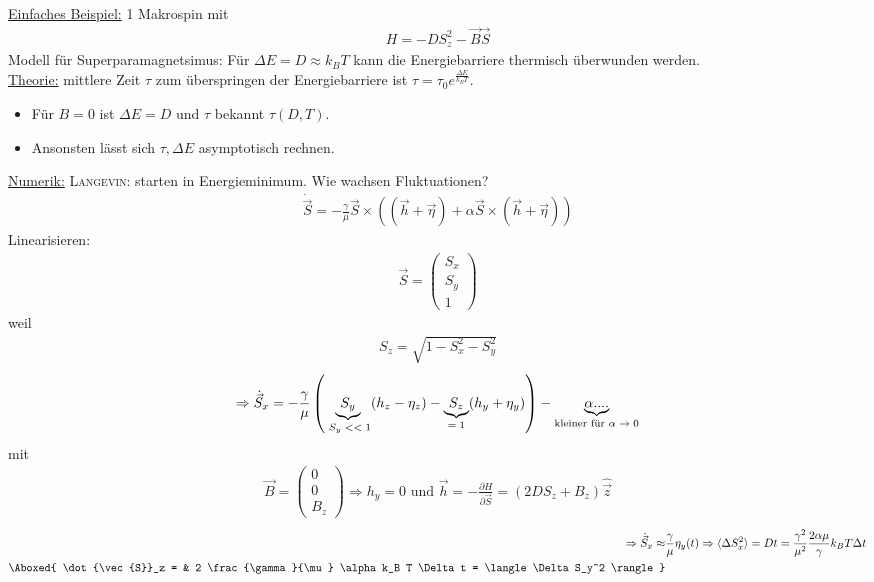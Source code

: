 \documentclass[12pt]{article}
\begin{document}
   \underline{Einfaches Beispiel:} 1 Makrospin mit 
   \begin{align*}
   H = -D S_z^2 - \vec{B} \vec{S}
   \end{align*}
   Modell für Superparamagnetsimus: Für $\Delta E = D \approx k_B T$ kann die Energiebarriere thermisch überwunden werden. \\
   \underline{Theorie:} mittlere Zeit $\tau$ zum überspringen der Energiebarriere ist $\tau = \tau_0 e^\frac{\Delta E}{k_B T}$. \begin{itemize}
   \item Für $B=0$ ist $\Delta E = D$ und $\tau $ bekannt $\tau (D, T)$. 
    \item Ansonsten lässt sich $\tau, \Delta E$ asymptotisch rechnen.
    \end{itemize}
    \underline{Numerik:} \textsc{Langevin:} starten in Energieminimum. Wie wachsen Fluktuationen?
    \begin{align}
    \dot{\vec{S}} = - \frac{\gamma}{\mu} \vec{S} \times \left( ( \vec{h} +  \vec{\eta}) + \alpha  \vec{S} \times ( \vec{h} +  \vec{\eta}) \right)
    \end{align}
    Linearisieren:
    \begin{align}
     \vec{S} = \begin{pmatrix}S_x\\ S_y \\ 1 \end{pmatrix}
    \end{align}
    weil 
    \begin{align}
    S_z = \sqrt{1- S_x^2 - S_y^2}
    \end{align}
    \begin{align}
    \Rightarrow \dot{\vec{S}}_x = - \frac{\gamma }{\mu} \left(
    \underbrace{ S_y}_\text{ $S_y <<1$} ( h_z - \eta_z ) - \underbrace{S_z}_\text{$=1$} (h_y + \eta_y) \right) - \underbrace{\alpha....}_\text{kleiner für $ \alpha \to 0$}
    \end{align}
    mit
    \begin{align}
    \vec{B} = \begin{pmatrix} 0 \\ 0 \\ B_z \end{pmatrix} \Rightarrow h_y = 0 \mbox{ und } \vec{h}= - \frac{\partial H}{\partial \vec{S}}= (2 DS_z + B_z) \hat{\vec{z}}
    \end{align}
    \begin{align}
    \Rightarrow \dot{\vec{S}}_x \approx & \frac{\gamma}{\mu} \eta_y (t) \Rightarrow \langle \Delta S_x^2 \rangle = Dt = \frac{\gamma ^2}{\mu ^2} \frac{2 \alpha \mu }{\gamma} k_B T \Delta t \\
   \Aboxed{  \dot{\vec{S}}_z = & 2 \frac{\gamma}{\mu} \alpha k_B T \Delta t = \langle \Delta S_y^2 \rangle}
    \end{align}
\end{document}
